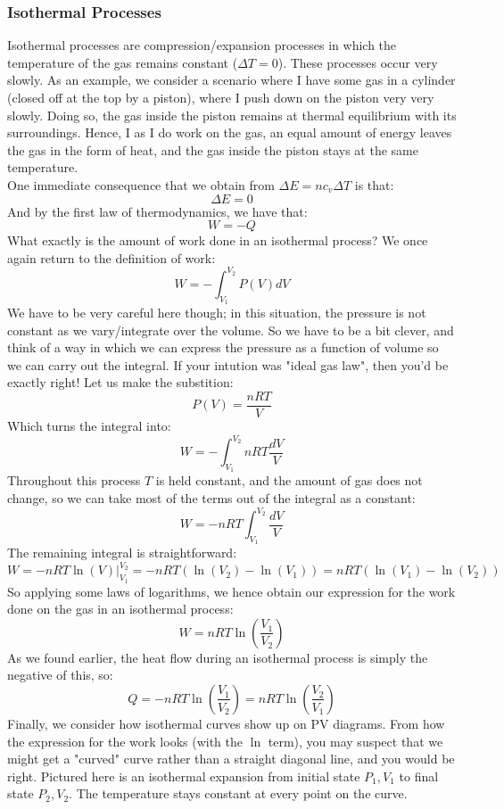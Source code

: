 \subsubsection{Isothermal Processes}
Isothermal processes are compression/expansion processes in which the temperature of the gas remains constant ($\Delta T = 0$). These processes occur very slowly. As an example, we consider a scenario where I have some gas in a cylinder (closed off at the top by a piston), where I push down on the piston very very slowly. Doing so, the gas inside the piston remains at thermal equilibrium with its surroundings. Hence, I as I do work on the gas, an equal amount of energy leaves the gas in the form of heat, and the gas inside the piston stays at the same temperature. \\
\noindent
One immediate consequence that we obtain from $\Delta E = nc_v\Delta T$ is that:
\begin{equation}
    \Delta E = 0
\end{equation}
And by the first law of thermodynamics, we have that:
\begin{equation}
    W = -Q
\end{equation}
What exactly is the amount of work done in an isothermal process? We once again return to the definition of work:
\[ W = -\int_{V_1}^{V_2}P(V)dV \]
We have to be very careful here though; in this situation, the pressure is not constant as we vary/integrate over the volume. So we have to be a bit clever, and think of a way in which we can express the pressure as a function of volume so we can carry out the integral. If your intution was "ideal gas law", then you'd be exactly right! Let us make the substition:
\[ P(V) = \frac{nRT}{V} \]
Which turns the integral into:
\[ W = -\int_{V_1}^{V_2}nRT\frac{dV}{V}\]
Throughout this process $T$ is held constant, and the amount of gas does not change, so we can take most of the terms out of the integral as a constant:
\[ W = -nRT\int_{V_1}^{V_2}\frac{dV}{V}\]
The remaining integral is straightforward:
\[ W = -nRT \left. \ln(V) \right|_{V_1}^{V_2} = -nRT\left(\ln(V_2)-\ln(V_1)\right) = nRT\left(\ln(V_1)-\ln(V_2)\right) \]
So applying some laws of logarithms, we hence obtain our expression for the work done on the gas in an isothermal process:
\begin{equation}
W = nRT\ln\left(\frac{V_1}{V_2}\right)
\end{equation}
As we found earlier, the heat flow during an isothermal process is simply the negative of this, so:
\begin{equation}
    Q = -nRT\ln\left(\frac{V_1}{V_2}\right) = nRT\ln\left(\frac{V_2}{V_1}\right)
\end{equation}
\noindent
Finally, we consider how isothermal curves show up on PV diagrams. From how the expression for the work looks (with the $\ln$ term), you may suspect that we might get a "curved" curve rather than a straight diagonal line, and you would be right. Pictured here is an isothermal expansion from initial state $P_1,V_1$ to final state $P_2,V_2$. The temperature stays constant at every point on the curve. 

